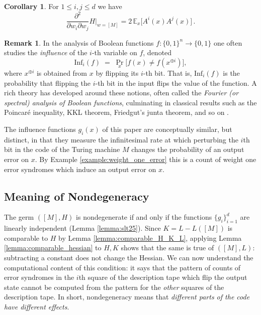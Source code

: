 \documentclass[english,letter paper,12pt,reqno]{article}
\theoremstyle{definition}
\newtheorem{corollary}[theorem]{Corollary}
\newtheorem{remark}[theorem]{Remark}
\def\be{\begin{equation}}
\def\ee{\end{equation}}
\newcommand{\lto}{\longrightarrow}
\begin{document}
\begin{corollary}\label{corollary:partial_formula_explicit_hessian} For $1 \le i, j \le d$ we have
\be\label{eq:partial_formula_explicit_hessian}
\frac{\partial^{2}}{ \partial w_i \partial w_j} H \Bigr|_{w = [M]} = 2\, \mathbb{E}_x\Big[ A^{i}(x) A^{j}(x) \Big]\,.
\ee
\end{corollary}

\begin{remark}\label{rmk:fourier_analysis}
In the analysis of Boolean functions \(f: \{0,1\}^n \lto \{0,1\}\) one often studies the \emph{influence} of the \(i\)-th variable on \(f\), denoted
\[
\mathrm{Inf}_i(f) \;=\; \Pr_{x}\bigl[f(x) \neq f(x^{\oplus i})\bigr],
\]
where \(x^{\oplus i}\) is obtained from \(x\) by flipping its \(i\)-th bit. That is, \(\mathrm{Inf}_i(f)\) is the probability that flipping the 
$i$-th bit in the input flips the value of the function. A rich theory has developed around these notions, often called the \emph{Fourier (or spectral) analysis of Boolean functions}, culminating in classical results such as the Poincar\'e inequality, KKL theorem, Friedgut's junta theorem, and so on \cite{o2014analysis}.

The influence functions $g_i(x)$ of this paper are conceptually similar, but distinct, in that they measure the infinitesimal rate at which perturbing the $i$th bit in the code of the Turing machine $M$ changes the probability of an output error on $x$. By Example \ref{example:weight_one_error} this is a count of weight one error syndromes which induce an output error on $x$.
\end{remark}

\subsection{Meaning of Nondegeneracy}\label{section:meaning_nondeg}

The germ $([M], H)$ is nondegenerate if and only if the functions $\{ g_i \}_{i=1}^d$ are linearly independent (Lemma \ref{lemma:slt25}). Since $K = L-L([M])$ is comparable to $H$ by Lemma \ref{lemma:comparable_H_K_L}, applying Lemma \ref{lemma:comparable_hessian} to $H,K$ shows that the same is true of $([M], L)$: subtracting a constant does not change the Hessian. We can now understand the computational content of this condition: it says that the pattern of counts of error syndromes in the $i$th square of the description tape which flip the output state cannot be computed from the pattern for the \emph{other} squares of the description tape. In short, nondegeneracy means that \emph{different parts of the code have different effects}.
\end{document}
